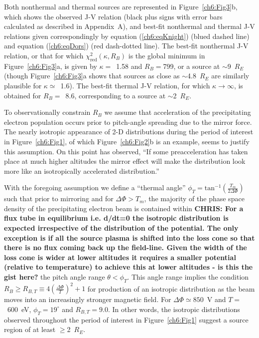   Both nonthermal and thermal sources are represented in Figure~\ref{ch6:Fig3}b,
  which shows the observed J-V relation (black plus signs with error bars
  calculated as described in Appendix~A), and best-fit nonthermal and thermal
  J-V relations given correspondingly by equation (\ref{ch6:eqKnight}) (blued
  dashed line) and equation (\ref{ch6:eqDors}) (red dash-dotted line). The
  best-fit nonthermal J-V relation, or that for which $\chi^2_{\textrm{red}} (
  \kappa, R_B )$ is the global minimum in Figure~\ref{ch6:Fig3}a, is given by
  $\kappa =$~1.58 and $R_B =$799, or a source at $\sim$9~$R_E$ (though
  Figure~\ref{ch6:Fig3}a shows that sources as close as $\sim$4.8~$R_E$ are
  similarly plausible for $\kappa \simeq$~1.6). The best-fit thermal J-V
  relation, for which $\kappa \rightarrow \infty$, is obtained for $R_B =$~8.6,
  corresponding to a source at $\sim$2~$R_E$.

  To observationally constrain $R_B$ we assume that acceleration of the
  precipitating electron population occurs prior to pitch-angle spreading due to
  the mirror force. The nearly isotropic appearance of 2-D distributions during
  the period of interest in Figure~\ref{ch6:Fig1}, of which
  Figure~\ref{ch6:Fig2}b is an example, seems to justify this assumption. On
  this point \citet{Bostrom2003a} has observed, ``If some preacceleration has
  taken place at much higher altitudes the mirror effect will make the
  distribution look more like an isotropically accelerated distribution.''

  With the foregoing assumption we define a ``thermal angle'' $\phi_T =
  \textrm{tan}^{-1} ( \frac{T_m}{2 \Delta \Phi} )$ such that prior to mirroring
  and for $\Delta \Phi > T_m$, the majority of the phase space density of the
  precipitating electron beam is contained within \textbf{CHRIS: For a flux tube
    in equilibrium i.e. d/dt=0 the isotropic distribution is expected
    irrespective of the distribution of the potential. The only exception is if
    all the source plasma is shifted into the loss cone so that there is no flux
    coming back up the field-line.  Given the width of the loss cone is wider at
    lower altitudes it requires a smaller potential (relative to temperature) to
    achieve this at lower altitudes - is this the gist here?}  the pitch angle
  range $ \theta < \phi_T$.  This angle range implies the condition $R_B \geq
  R_{B,T} \equiv 4 ( \frac{\Delta \Phi}{T} )^2 + 1$ for production of an
  isotropic distribution as the beam moves into an increasingly stronger
  magnetic field. For $\Delta \Phi \simeq 850$~V and $T =$~600~eV, $\phi_T =
  19^\circ$ and $R_{B,T} = 9.0$.
  In other words, the isotropic distributions observed throughout the period of
  interest in Figure~\ref{ch6:Fig1} suggest a source region of at least
  $\geq$2~$R_E$.

